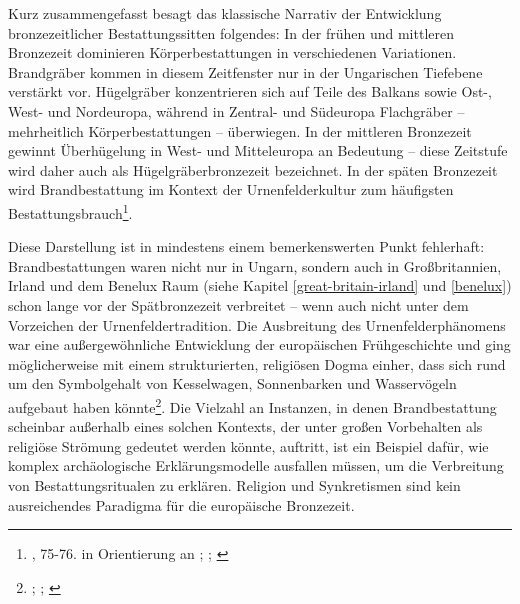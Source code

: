 \documentclass[openany,twoside,twocolumn]{book}
\let\rmarkdownfootnote\footnote%
\def\footnote{\protect\rmarkdownfootnote}
\begin{document}
Kurz zusammengefasst besagt das klassische Narrativ der Entwicklung
bronzezeitlicher Bestattungssitten folgendes: In der frühen und
mittleren Bronzezeit dominieren Körperbestattungen in verschiedenen
Variationen. Brandgräber kommen in diesem Zeitfenster nur in der
Ungarischen Tiefebene verstärkt vor. Hügelgräber konzentrieren sich auf
Teile des Balkans sowie Ost-, West- und Nordeuropa, während in Zentral-
und Südeuropa Flachgräber -- mehrheitlich Körperbestattungen --
überwiegen. In der mittleren Bronzezeit gewinnt Überhügelung in West-
und Mitteleuropa an Bedeutung -- diese Zeitstufe wird daher auch als
Hügelgräberbronzezeit bezeichnet. In der späten Bronzezeit wird
Brandbestattung im Kontext der Urnenfelderkultur zum häufigsten
Bestattungsbrauch\footnote{\textcite{harding_european_2000}, 75-76. in
  Orientierung an \textcite{hausler_bestattungssitten_1977};
  \textcite{hausler_grab-_1994};
  \textcite{hausler_totenorientierung_1996}}.

Diese Darstellung ist in mindestens einem bemerkenswerten Punkt
fehlerhaft: Brandbestattungen waren nicht nur in Ungarn, sondern auch in
Großbritannien, Irland und dem Benelux Raum (siehe Kapitel
\ref{great-britain-irland} und \ref{benelux}) schon lange vor der
Spätbronzezeit verbreitet -- wenn auch nicht unter dem Vorzeichen der
Urnenfeldertradition. Die Ausbreitung des Urnenfelderphänomens war eine
außergewöhnliche Entwicklung der europäischen Frühgeschichte und ging
möglicherweise mit einem strukturierten, religiösen Dogma einher, dass
sich rund um den Symbolgehalt von Kesselwagen, Sonnenbarken und
Wasservögeln aufgebaut haben könnte\footnote{\textcite{bilic_swan_2016};
  \textcite{kimmig_seevolkerbewegung_1964};
  \textcite{molloy_european_2018}}. Die Vielzahl an Instanzen, in denen
Brandbestattung scheinbar außerhalb eines solchen Kontexts, der unter
großen Vorbehalten als religiöse Strömung gedeutet werden könnte,
auftritt, ist ein Beispiel dafür, wie komplex archäologische
Erklärungsmodelle ausfallen müssen, um die Verbreitung von
Bestattungsritualen zu erklären. Religion und Synkretismen sind kein
ausreichendes Paradigma für die europäische Bronzezeit.
\end{document}
